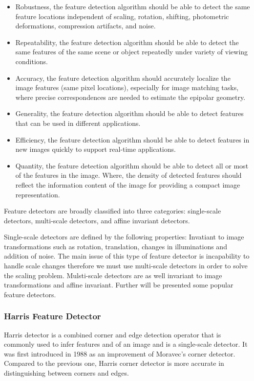 \documentclass[9pt,shortpaper,twoside,web]{ieeecolor}
\begin{document}
\begin{itemize}

\item Robustness, the feature detection algorithm should be able to detect the same feature locations independent of scaling, rotation, shifting, photometric deformations, compression artifacts, and noise.

\item Repeatability, the feature detection algorithm should be able to detect the same features of the same scene or object repeatedly under variety of viewing conditions.

\item Accuracy, the feature detection algorithm should accurately localize the image features (same pixel locations), especially for image matching tasks, where precise correspondences are needed to estimate the epipolar geometry.

\item Generality, the feature detection algorithm should be able to detect features that can be used in different applications.

\item Efficiency, the feature detection algorithm should be able to detect features in new images quickly to support real-time applications.

\item Quantity, the feature detection algorithm should be able to detect all or most of the features in the image. Where, the density of detected features should reflect the information content of the image for providing a compact image representation. \cite{b2}

\end{itemize}

Feature detectors are broadly classified into three categories: single-scale detectors, multi-scale detectors, and affine invariant detectors.

Single-scale detectors are defined by the following properties: Invatiant to image transformations such as rotation, translation, changes in illuminations and addition of noise. The main issue of this type of feature detector is incapability to handle scale changes therefore we must use multi-scale detectors in order to solve the scaling problem. Mulsti-scale detectors are as well invariant to image transformations and affine invariant. Further will be presented some popular feature detectors.
\\

\subsubsection{Harris Feature Detector}
Harris detector is a combined corner and edge detection operator that is commonly used to infer features and of an image and is a single-scale detector. It was first introduced in 1988 as an improvement of Moravec's corner detector. Compared to the previous one, Harris corner detector is more accurate in distinguishing between corners and edges.
\end{document}
